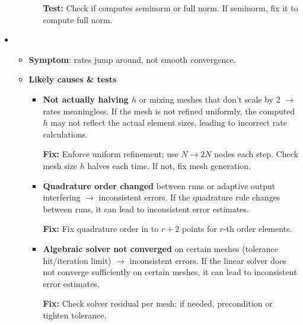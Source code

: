 \begin{itemize}
\begin{itemize}
\begin{itemize}
            \textcolor{Green3}{ \textbf{Test:}} Check if  computes seminorm or full norm. If seminorm, fix it to compute full norm.
        \end{itemize}
    \end{itemize}

    \item {}
    \begin{itemize}
        \item[\textcolor{Green3}{\faIcon{bug}}] \textbf{Symptom}: rates jump around, not smooth convergence.
        \item[\textcolor{Green3}{\faIcon{check}}] \textbf{Likely causes \& tests}
        \begin{itemize}
            \item \textbf{Not actually halving $h$} or mixing meshes that don't scale by 2 $\to$ rates meaningless. If the mesh is not refined uniformly, the computed $h$ may not reflect the actual element sizes, leading to incorrect rate calculations.

            \textcolor{Green3}{ \textbf{Fix:}} Enforce uniform refinement; use $N \to 2N$ nodes each step. Check mesh size $h$ halves each time. If not, fix mesh generation.


            \item \textbf{Quadrature order changed} between runs or adaptive output interfering $\to$ inconsistent errors. If the quadrature rule changes between runs, it can lead to inconsistent error estimates.

            \textcolor{Green3}{ \textbf{Fix:}} Fix quadrature order in  to $r+2$ points for $r$-th order elements.


            \item \textbf{Algebraic solver not converged} on certain meshes (tolerance hit/iteration limit) $\to$ inconsistent errors. If the linear solver does not converge sufficiently on certain meshes, it can lead to inconsistent error estimates.

            \textcolor{Green3}{ \textbf{Fix:}} Check solver residual per mesh; if needed, precondition or tighten tolerance.
        \end{itemize}
    \end{itemize}


\end{itemize}
